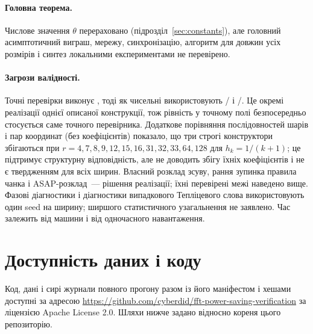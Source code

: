 \documentclass[11pt]{article}
\theoremstyle{plain}
\begin{document}
\paragraph{Головна теорема.}
Числове значення $\theta$ перераховано (підрозділ~\ref{sec:constants}), але головний асимптотичний виграш, мережу, синхронізацію, алгоритм для довжин усіх розмірів і синтез локальними експериментами не перевірено.

\paragraph{Загрози валідності.}
Точні перевірки виконує , тоді як чисельні використовують / і /. Це окремі реалізації однієї описаної конструкції, тож рівність у точному полі безпосередньо стосується саме точного перевірника. Додаткове порівняння послідовностей шарів і пар координат (без коефіцієнтів) показало, що три строгі конструктори збігаються при $r=4,7,8,9,12,15,16,31,32,33,64,128$ для $h_k=1/(k+1)$; це підтримує структурну відповідність, але не доводить збігу їхніх коефіцієнтів і не є твердженням для всіх ширин. Власний розклад зсуву, рання зупинка правила чанка і ASAP-розклад~--- рішення реалізації; їхні перевірені межі наведено вище. Фазові діагностики і діагностики випадкового Тепліцевого слова використовують один seed на ширину; ширшого статистичного узагальнення не заявлено. Час залежить від машини і від одночасного навантаження.

\section{Доступність даних і коду}\label{sec:availability}
Код, дані і сирі журнали повного прогону  разом із його маніфестом і хешами доступні за адресою \url{https://github.com/cyberdid/fft-power-saving-verification} за ліцензією Apache License 2.0. Шляхи нижче задано відносно кореня цього репозиторію.
\end{document}
